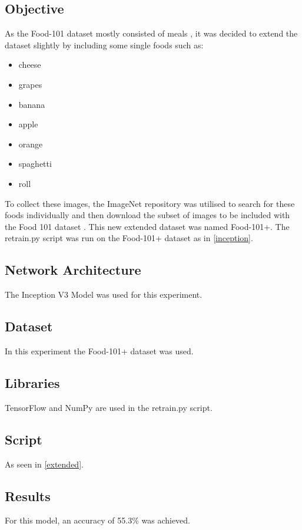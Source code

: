 \subsection*{Objective}
As the Food-101 dataset mostly consisted of meals \parencite{food101}, it was decided to extend the
dataset slightly by including some single foods such as:
\begin{itemize}
    \item{cheese}
    \item{grapes}
    \item{banana}
    \item{apple}
    \item{orange}
    \item{spaghetti}
    \item{roll}
\end{itemize}

To collect these images, the ImageNet repository was utilised to search for
these foods individually and then download the subset of images to be included
with the Food 101 dataset \parencite{imagenet}.
This new extended dataset was named Food-101+.
The retrain.py script was run on the Food-101+ dataset as in
\ref{inception}.

\subsection*{Network Architecture}
The Inception V3 Model was used for this experiment.

\subsection*{Dataset}
In this experiment the Food-101+ dataset was used.

\subsection*{Libraries}
TensorFlow and NumPy are used in the retrain.py script.

\subsection*{Script}
As seen in \ref{extended}.

\subsection*{Results}
For this model, an accuracy of 55.3\% was achieved.

